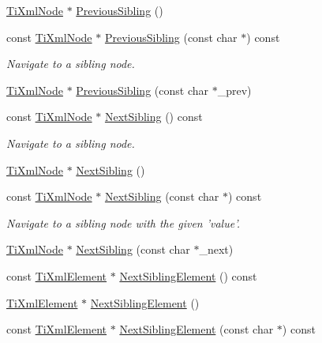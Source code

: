\begin{DoxyCompactItemize}
\hyperlink{class_ti_xml_node}{TiXmlNode} $\ast$ \hyperlink{class_ti_xml_node_af8c0642ad6ecc03f62953e68896ed1cc}{PreviousSibling} ()
\item 
const \hyperlink{class_ti_xml_node}{TiXmlNode} $\ast$ \hyperlink{class_ti_xml_node_abbb3b8c1f38fa7b9e52d584a4aeca795}{PreviousSibling} (const char $\ast$) const 
\begin{DoxyCompactList}\small\item\em Navigate to a sibling node. \item\end{DoxyCompactList}\item 
\hyperlink{class_ti_xml_node}{TiXmlNode} $\ast$ \hyperlink{class_ti_xml_node_a6c977049207177ef21b51972315c2053}{PreviousSibling} (const char $\ast$\_\-prev)
\item 
const \hyperlink{class_ti_xml_node}{TiXmlNode} $\ast$ \hyperlink{class_ti_xml_node_af854baeba384f5fe9859f5aee03b548e}{NextSibling} () const 
\begin{DoxyCompactList}\small\item\em Navigate to a sibling node. \item\end{DoxyCompactList}\item 
\hyperlink{class_ti_xml_node}{TiXmlNode} $\ast$ \hyperlink{class_ti_xml_node_a4d05f7b1d7b470ac6887edd072d4892a}{NextSibling} ()
\item 
const \hyperlink{class_ti_xml_node}{TiXmlNode} $\ast$ \hyperlink{class_ti_xml_node_acaf9dc17531ac041f602f9ad579573ea}{NextSibling} (const char $\ast$) const 
\begin{DoxyCompactList}\small\item\em Navigate to a sibling node with the given 'value'. \item\end{DoxyCompactList}\item 
\hyperlink{class_ti_xml_node}{TiXmlNode} $\ast$ \hyperlink{class_ti_xml_node_a4080bc5cc8a5c139e7cf308669e850fc}{NextSibling} (const char $\ast$\_\-next)
\item 
const \hyperlink{class_ti_xml_element}{TiXmlElement} $\ast$ \hyperlink{class_ti_xml_node_a7667217e269e0da01d1f82aee94d1a3d}{NextSiblingElement} () const 
\item 
\hyperlink{class_ti_xml_element}{TiXmlElement} $\ast$ \hyperlink{class_ti_xml_node_a1b211cb5034655a04358e0e2f6fc5010}{NextSiblingElement} ()
\item 
const \hyperlink{class_ti_xml_element}{TiXmlElement} $\ast$ \hyperlink{class_ti_xml_node_a3d7897999f99cf4870dd59df6331d7ff}{NextSiblingElement} (const char $\ast$) const 

\end{DoxyCompactItemize}
